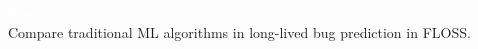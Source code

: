 
%    
%


\bgroup
\begin{frame}[plain, c]{}
    \begin{center}
        \LARGE \colorbox{BurntOrange}{\textcolor{White}{Goal 2}}\\
        \Large Compare traditional ML algorithms in \alert{long-lived bug prediction} in FLOSS.
    \end{center}
\end{frame}
\egroup

